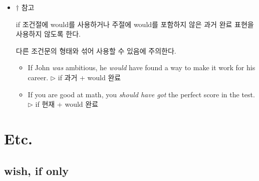 \documentclass[ a4paper]{oblivoir}
\begin{document}
    \begin{itemize}[label = {}]
        \item {\footnotesize $\dagger$ 참고
        
        if 조건절에 would를 사용하거나 주절에 would를 포함하지 않은 과거 완료 표현을 사용하지 않도록 한다.
        
        다른 조건문의 형태와 섞어 사용할 수 있음에 주의한다. 
        \begin{itemize}[label = {--}]
            \item If John \emph{was} ambitious, he \emph{would} have found a way to make it work for his career. $\triangleright$ if 과거 + would 완료
            \item If you are good at math, you \emph{should have got} the perfect score in the test. $\triangleright$ if 현재 + would 완료
        \end{itemize}
        }
    \end{itemize}
    

    \section{Etc.}

    \subsection{wish, if only}
\end{document}
